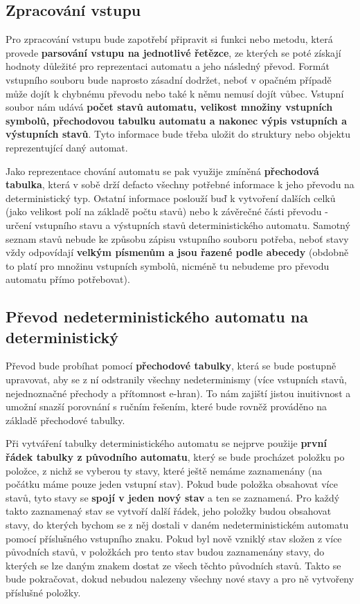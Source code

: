 \documentclass[11pt]{article}
\begin{document}
\subsection{Zpracování vstupu}
Pro zpracování vstupu bude zapotřebí připravit si funkci nebo metodu, která provede \textbf{parsování vstupu na jednotlivé řetězce}, ze kterých se poté získají hodnoty důležité pro reprezentaci automatu a jeho následný převod. Formát vstupního souboru bude naprosto zásadní dodržet, neboť v opačném případě může dojít k chybnému převodu nebo také k němu nemusí dojít vůbec. Vstupní soubor nám udává \textbf{počet stavů automatu, velikost množiny vstupních symbolů, přechodovou tabulku automatu a nakonec výpis vstupních a výstupních stavů}. Tyto informace bude třeba uložit do struktury nebo objektu reprezentující daný automat.

Jako reprezentace chování automatu se pak využije zmíněná \textbf{přechodová tabulka}, která v sobě drží defacto všechny potřebné informace k jeho převodu na deterministický typ. Ostatní informace poslouží buď k vytvoření dalších celků (jako velikost polí na základě počtu stavů) nebo k závěrečné části převodu - určení vstupního stavu a výstupních stavů deterministického automatu. Samotný seznam stavů nebude ke způsobu zápisu vstupního souboru potřeba, neboť stavy vždy odpovídají \textbf{velkým písmenům a jsou řazené podle abecedy} (obdobně to platí pro množinu vstupních symbolů, nicméně tu nebudeme pro převodu automatu přímo potřebovat).

\subsection{Převod nedeterministického automatu na deterministický}
Převod bude probíhat pomocí \textbf{přechodové tabulky}, která se bude postupně upravovat, aby se z ní odstranily všechny nedeterminismy (více vstupních stavů, nejednoznačné přechody a přítomnost e-hran). To nám zajiští jistou inuitivnost a umožní snazší porovnání s ručním řešením, které bude rovněž prováděno na základě přechodové tabulky.

Při vytváření tabulky deterministického automatu se nejprve použije \textbf{první řádek tabulky z původního automatu}, který se bude procházet položku po položce, z nichž se vyberou ty stavy, které ještě nemáme zaznamenány (na počátku máme pouze jeden vstupní stav). Pokud bude položka obsahovat více stavů, tyto stavy se \textbf{spojí v jeden nový stav} a ten se zaznamená. Pro každý takto zaznamenaý stav se vytvoří další řádek, jeho položky budou obsahovat stavy, do kterých bychom se z něj dostali v daném nedeterministickém automatu pomocí příslušného vstupního znaku. Pokud byl nově vzniklý stav složen z více původních stavů, v položkách pro tento stav budou zaznamenány stavy, do kterých se lze daným znakem dostat ze všech těchto původních stavů. Takto se bude pokračovat, dokud nebudou nalezeny všechny nové stavy a pro ně vytvořeny příslušné položky.
\end{document}
